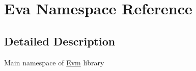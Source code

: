\hypertarget{namespace_eva}{}\section{Eva Namespace Reference}
\label{namespace_eva}


\subsection{Detailed Description}
Main namespace of \mbox{\hyperlink{namespace_evm}{Evm}} library 